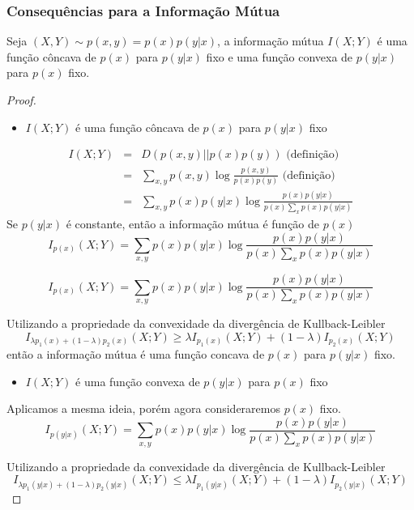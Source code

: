 \begin{frame}[allowframebreaks]
  \frametitle{Consequências para a Informação Mútua}
  Seja $(X,Y) \sim p(x,y) = p(x)p(y|x)$, a informação mútua $I(X;Y)$ é uma função côncava
  de $p(x)$ para $p(y|x)$ fixo e uma função convexa de $p(y|x)$ para $p(x)$ fixo.

  \framebreak
  \begin{proof}
    \begin{itemize} \item $I(X;Y)$ é uma função côncava de $p(x)$ para $p(y|x)$ fixo \end{itemize}
    \vspace{-2ex}
    \begin{eqnarray}
    I(X;Y) &=& D(p(x,y)||p(x)p(y)) \text{ (definição) } \nonumber \\
        &=& \sum_{x,y} p(x,y) \log \frac{p(x,y)}{p(x)p(y)} \text{ (definição) } \nonumber \\
        &=& \sum_{x,y} p(x)p(y|x) \log \frac{ p(x)p(y|x) }{p(x) \sum_x p(x) p(y|x)}
    \end{eqnarray}
    Se $p(y|x)$ é constante, então a informação mútua é função de $p(x)$
    \vspace{-1ex}
    \begin{equation}
    I_{p(x)} (X;Y) = \sum_{x,y} p(x) p(y|x) \log \frac{p(x) p(y|x)}{p(x) \sum_x p(x) p(y|x)}
    \end{equation}  

    \proofbreak
    
    \begin{equation}
    I_{p(x)} (X;Y) = \sum_{x,y} p(x) p(y|x) \log \frac{p(x) p(y|x)}{p(x) \sum_x p(x) p(y|x)}
    \end{equation}

    Utilizando a propriedade da convexidade da divergência de Kullback-Leibler
    \begin{equation}\label{eq-Imixpx}
    I_{\lambda p_1(x) + (1-\lambda)p_2(x)} (X;Y) \geq \lambda I_{p_1(x)} (X;Y) + (1-\lambda) I_{p_2(x)} (X;Y)
    \end{equation}
    então a informação mútua é uma função concava de $p(x)$ para $p(y|x)$ fixo.


    \proofbreak

    \begin{itemize} \item $I(X;Y)$ é uma função convexa de $p(y|x)$ para $p(x)$ fixo \end{itemize}
    Aplicamos a mesma ideia, porém agora consideraremos $p(x)$ fixo.
    \begin{equation}
    I_{p(y|x)} (X;Y) = \sum_{x,y} p(x) p(y|x) \log \frac{p(x) p(y|x)}{p(x) \sum_x p(x) p(y|x)}
    \end{equation}

    Utilizando a propriedade da convexidade da divergência de Kullback-Leibler
    \begin{equation}\label{eq-Imixpxy}
    I_{\lambda p_1(y|x) + (1-\lambda)p_2(y|x)} (X;Y) \leq \lambda I_{p_1(y|x)} (X;Y) + (1-\lambda) I_{p_2(y|x)} (X;Y)
    \end{equation}

  \end{proof}
\end{frame}
